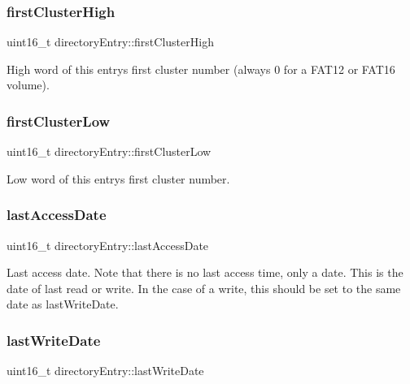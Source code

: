\subsubsection{\texorpdfstring{first\+Cluster\+High}{firstClusterHigh}}
{\footnotesize\ttfamily uint16\+\_\+t directory\+Entry\+::first\+Cluster\+High}

High word of this entry\textquotesingle{}s first cluster number (always 0 for a F\+A\+T12 or F\+A\+T16 volume). \mbox{\label{structdirectory_entry_a74bd660417a9c3501eae353326c14bb9}} 
\subsubsection{\texorpdfstring{first\+Cluster\+Low}{firstClusterLow}}
{\footnotesize\ttfamily uint16\+\_\+t directory\+Entry\+::first\+Cluster\+Low}

Low word of this entry\textquotesingle{}s first cluster number. \mbox{\label{structdirectory_entry_abca70dc5c5fcbe199fd78df010111331}} 
\subsubsection{\texorpdfstring{last\+Access\+Date}{lastAccessDate}}
{\footnotesize\ttfamily uint16\+\_\+t directory\+Entry\+::last\+Access\+Date}

Last access date. Note that there is no last access time, only a date. This is the date of last read or write. In the case of a write, this should be set to the same date as last\+Write\+Date. \mbox{\label{structdirectory_entry_a12b2e7cf87482a942a0b5d3df6c51468}} 
\subsubsection{\texorpdfstring{last\+Write\+Date}{lastWriteDate}}
{\footnotesize\ttfamily uint16\+\_\+t directory\+Entry\+::last\+Write\+Date}

